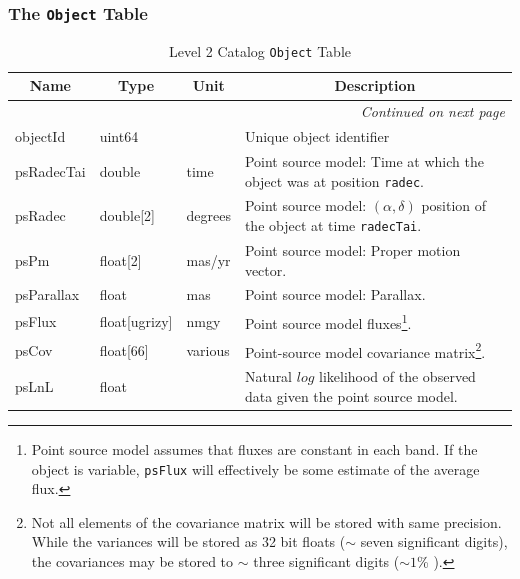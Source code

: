 \documentclass[12pt]{article}
\newcommand{\code}[1]{\texttt{#1}}
\newcommand{\DIASource}{\code{DIASource}\xspace}
\newcommand{\Object}{\code{Object}\xspace}
\begin{document}
\subsubsection{The \Object Table}
\label{sec:objectTable}

\begin{center}
\begin{longtable}{p{3cm}p{2cm}p{2cm}p{5cm}}
\caption[\DIASource Table]{Level 2 Catalog \Object Table
} \\

\hline \multicolumn{1}{c}{\bf Name} & \multicolumn{1}{c}{\bf Type} & \multicolumn{1}{c}{\bf Unit} & \multicolumn{1}{c}{\bf Description} \\ \hline
\endhead

\hline \multicolumn{4}{r}{{\em Continued on next page}} \\
\endfoot

\hline\hline
\endlastfoot

objectId & uint64 & ~ & Unique object identifier \\ 

psRadecTai & double & time & Point source model: Time at which the object was at position {\tt radec}. \\

psRadec & double[2] & degrees & Point source model: $(\alpha, \delta)$ position of the object at time {\tt radecTai}. \\

psPm & float[2] & mas/yr & Point source model: Proper motion vector.\\ 

psParallax & float & mas & Point source model: Parallax. \\ 

psFlux & float[ugrizy] & nmgy & Point source model fluxes\footnote{Point source model assumes that fluxes are constant in each band. If the object is variable, {\tt psFlux} will effectively be some estimate of the average flux.}.\\ 

psCov & float[66] & various & Point-source model covariance matrix\footnote{Not all elements of the covariance matrix will be stored with same precision. While the variances will be stored as 32 bit floats ($\sim$ seven significant digits), the covariances may be stored to $\sim$ three significant digits ($\sim 1$\% ).}. \\ 

psLnL & float & ~ & Natural $log$ likelihood of the observed data given the point source model. \\ 



\end{longtable}
\end{center}
\end{document}
